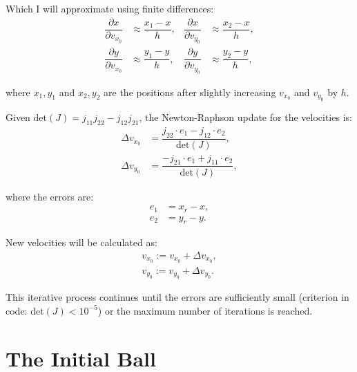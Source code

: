 \documentclass{article}
\begin{document}
	Which I will approximate using finite differences:
	\begin{align*}
		\dfrac{\partial x}{\partial v_{x_0}} &\approx \dfrac{x_1 - x}{h}, &
		\dfrac{\partial x}{\partial v_{y_0}} &\approx \dfrac{x_2 - x}{h}, \\
		\dfrac{\partial y}{\partial v_{x_0}} &\approx \dfrac{y_1 - y}{h}, &
		\dfrac{\partial y}{\partial v_{y_0}} &\approx \dfrac{y_2 - y}{h},
	\end{align*}
	
	where $x_1, y_1$ and $x_2, y_2$ are the positions after slightly increasing $v_{x_0}$ and $v_{y_0}$ by $h$.
	
	Given $\text{det}(J) = j_{11} j_{22} - j_{12} j_{21}$, the Newton-Raphson update for the velocities is:
	\begin{align*}
		\Delta v_{x_0} &= \dfrac{j_{22} \cdot e_1 - j_{12} \cdot e_2}{\text{det}(J)}, \\
		\Delta v_{y_0} &= \dfrac{-j_{21} \cdot e_1 + j_{11} \cdot e_2}{\text{det}(J)},
	\end{align*}
	
	where the errors are:
	\begin{align*}
		e_1 &= x_r - x, \\
		e_2 &= y_r - y.
	\end{align*}
	
	New velocities will be calculated as:
	\begin{align*}
		v_{x_0} := v_{x_0} + \Delta v_{x_0}, \\
		v_{y_0} := v_{y_0} + \Delta v_{y_0}.
	\end{align*}
	
	This iterative process continues until the errors are sufficiently small (criterion in code: $\text{det}(J) < 10^{-5}$) or the maximum number of iterations is reached.

	\section*{The Initial Ball}
	
\end{document}
